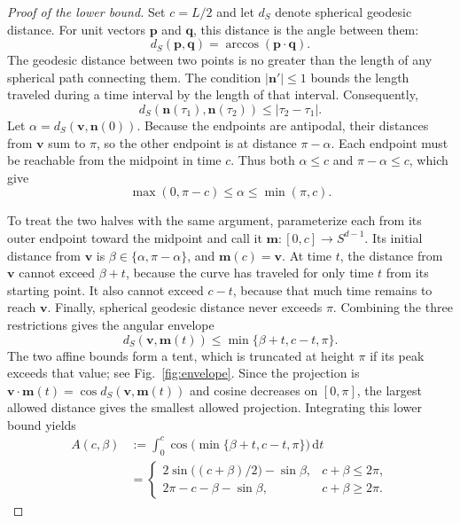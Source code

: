 \documentclass[12pt]{iopjournal}
\newcommand{\dd}{\mathrm{d}}
\newcommand{\nvec}{\mathbf n}
\newcommand{\vvec}{\mathbf v}
\begin{document}
\begin{proof}[Proof of the lower bound]
Set $c=L/2$ and let $d_S$ denote spherical geodesic distance. For unit
vectors $\mathbf p$ and $\mathbf q$, this distance is the angle
between them:
\begin{equation*}
 d_S(\mathbf p,\mathbf q)=\arccos(\mathbf p\cdot\mathbf q).
\end{equation*}
The geodesic distance between two points is no greater than the length
of any spherical path connecting them. The condition $|\nvec'|\le1$
bounds the length traveled during a time interval by the length of
that interval. Consequently,
\begin{equation}
 d_S(\nvec(\tau_1),\nvec(\tau_2))\le|\tau_2-\tau_1|.
 \label{eq:lipschitz-sphere}
\end{equation}
Let $\alpha=d_S(\vvec,\nvec(0))$. Because the endpoints are antipodal,
their distances from $\vvec$ sum to $\pi$, so the other endpoint is
at distance $\pi-\alpha$. Each endpoint must be reachable from the
midpoint in time $c$. Thus both $\alpha\le c$ and $\pi-\alpha\le c$,
which give
\begin{equation}
 \max(0,\pi-c)\le\alpha\le\min(\pi,c).
 \label{eq:feasible-alpha}
\end{equation}

To treat the two halves with the same argument, parameterize each
from its outer endpoint toward the midpoint and call it
$\mathbf m:[0,c]\to S^{d-1}$. Its initial distance from $\vvec$ is
$\beta\in\{\alpha,\pi-\alpha\}$, and $\mathbf m(c)=\vvec$.
At time $t$, the distance from $\vvec$ cannot exceed $\beta+t$,
because the curve has traveled for only time $t$ from its starting
point. It also cannot exceed $c-t$, because that much time remains
to reach $\vvec$. Finally, spherical geodesic distance never exceeds
$\pi$. Combining the three restrictions gives the angular envelope
\begin{equation}
 d_S(\vvec,\mathbf m(t))\le\min\{\beta+t,c-t,\pi\}.
 \label{eq:envelope}
\end{equation}
The two affine bounds form a tent, which is truncated at height
$\pi$ if its peak exceeds that value; see Fig.~\ref{fig:envelope}.
Since the projection is
$\vvec\cdot\mathbf m(t)=\cos d_S(\vvec,\mathbf m(t))$ and cosine
decreases on $[0,\pi]$, the largest allowed distance gives the
smallest allowed projection. Integrating this lower bound yields
\begin{align}
 A(c,\beta)
 &:=\int_0^c\cos\bigl(\min\{\beta+t,c-t,\pi\}\bigr)\,\dd t
 \nonumber\\
 &=\begin{cases}
 2\sin\bigl((c+\beta)/2\bigr)-\sin\beta,
       &c+\beta\le2\pi,\\[1mm]
 2\pi-c-\beta-\sin\beta,
       &c+\beta\ge2\pi.
 \end{cases}
 \label{eq:A}
\end{align}


\end{proof}
\end{document}
